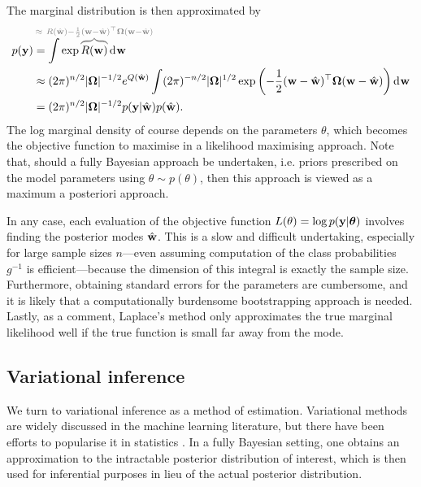 The marginal distribution is then approximated by
\begin{align*}
  p(\by) 
  &= \int \exp
  \greyoverbrace{R(\bw)}{\hidewidth \approx \ R(\hat\bw) - \half (\bw - \hat\bw)^\top \bOmega (\bw - \hat\bw)\hidewidth}
   \dint \bw \\
  &\approx (2\pi)^{n/2} \abs{\bOmega}^{-1/2} e^{Q(\hat\bw)} 
  \int (2\pi)^{-n/2} \abs{\bOmega}^{1/2} \exp \left(- \half (\bw - \hat\bw)^\top \bOmega (\bw - \hat\bw) \right) \dint\bw \\
  &= (2\pi)^{n/2} \abs{\bOmega}^{-1/2} p(\by|\hat\bw)p(\hat\bw).
\end{align*} 
The log marginal density of course depends on the parameters $\theta$, which becomes the objective function to maximise in a likelihood maximising approach.
Note that, should a fully Bayesian approach be undertaken, i.e. priors prescribed on the model parameters using $\theta \sim p(\theta)$, then this approach is viewed as a maximum a posteriori approach.

In any case, each evaluation of the objective function $L(\theta) = \log p({\mathbf y}|{\bm\theta})$ involves finding the posterior modes $\hat{{\mathbf w}}$.
This is a slow and difficult undertaking, especially for large sample sizes $n$---even assuming computation of the class probabilities $g^{-1}$ is efficient---because the dimension of this integral is exactly the sample size.
Furthermore, obtaining standard errors for the parameters are cumbersome, and it is likely that a computationally burdensome bootstrapping approach is needed.
Lastly, as a comment, Laplace's method only approximates the true marginal likelihood well if the true function is small far away from the mode.

\subsection{Variational inference}

We turn to variational inference as a method of estimation. 
Variational methods are widely discussed in the machine learning literature, but there have been efforts to popularise it in statistics \citep{blei2017variational}.
In a fully Bayesian setting, one obtains an approximation to the intractable posterior distribution of interest, which is then used for inferential purposes in lieu of the actual posterior distribution.

